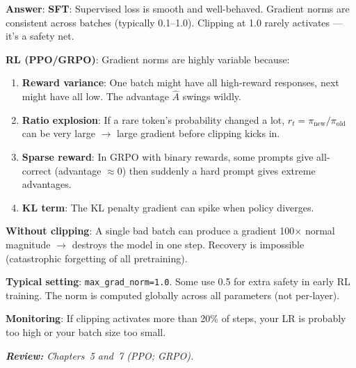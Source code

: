 \begin{questionbox}
\textbf{Answer}: \textbf{SFT}: Supervised loss is smooth and well-behaved. Gradient norms are consistent across batches (typically 0.1--1.0). Clipping at 1.0 rarely activates --- it’s a safety net.

\textbf{RL (PPO/GRPO)}: Gradient norms are highly variable because:

\begin{enumerate}
  \item \textbf{Reward variance}: One batch might have all high-reward responses, next might have all low. The advantage $\hat{A}$ swings wildly.
  \item \textbf{Ratio explosion}: If a rare token’s probability changed a lot, $r_t = \pi_\text{new}/\pi_\text{old}$ can be very large $\rightarrow$ large gradient before clipping kicks in.
  \item \textbf{Sparse reward}: In GRPO with binary rewards, some prompts give all-correct (advantage $\approx 0$) then suddenly a hard prompt gives extreme advantages.
  \item \textbf{KL term}: The KL penalty gradient can spike when policy diverges.
\end{enumerate}

\textbf{Without clipping}: A single bad batch can produce a gradient 100$\times$ normal magnitude $\rightarrow$ destroys the model in one step. Recovery is impossible (catastrophic forgetting of all pretraining).

\textbf{Typical setting}: \texttt{max\_grad\_norm=1.0}. Some use 0.5 for extra safety in early RL training. The norm is computed globally across all parameters (not per-layer).

\textbf{Monitoring}: If clipping activates more than 20\% of steps, your LR is probably too high or your batch size too small.

\emph{\textbf{Review:} Chapters~5 and~7 (PPO; GRPO).}
\end{questionbox}

